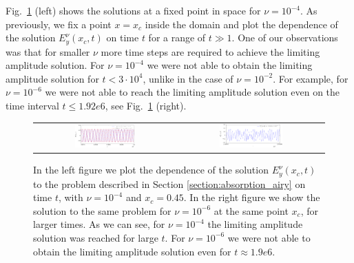\FloatBarrier
Fig.~\ref{fig:nu1e4_harmon} (left) shows the solutions at a fixed point in space for $\nu=10^{-4}$. As previously, 
 we fix a point $x=x_c$ inside the domain and plot 
the dependence of the solution $E_{y}^{\nu}(x_c,t)$ on time $t$ for a range of $t\gg 1$. 
One of our observations was that for smaller $\nu$ more time steps are required to achieve the limiting amplitude solution. 
For $\nu=10^{-4}$ we were not able to obtain the limiting amplitude solution for $t<3\cdot 10^{4}$, unlike in the case of $\nu=10^{-2}$. 
For example, for $\nu=10^{-6}$ we were not able to reach the limiting amplitude solution even on the time interval $t\leq 1.92e6$, 
see Fig.~\ref{fig:nu1e4_harmon} (right). 
\begin{figure}
\begin{tabular}{cc}
 \includegraphics[width=0.45\textwidth]{pics_time_domain/airy/figure_nu1e4-crop.pdf}&
 \includegraphics[width=0.45\textwidth]{pics_time_domain/airy/figure_nu1e6-crop.pdf}\\
\end{tabular}
\caption{In the left figure we plot the dependence of the solution $E_{y}^{\nu}(x_c,t)$ to the problem described in Section \ref{section:absorption_airy} on time $t$, with $\nu=10^{-4}$ and $x_c=0.45$. 
In the right figure we show the solution to the same problem for $\nu=10^{-6}$ at the same point $x_c$, for larger times. As we can see, for 
$\nu=10^{-4}$ the limiting amplitude solution was reached for large $t$. For $\nu=10^{-6}$ we were not able 
to obtain the limiting amplitude solution even for $t\approx 1.9e6$. }
  \label{fig:nu1e4_harmon}
\end{figure}

